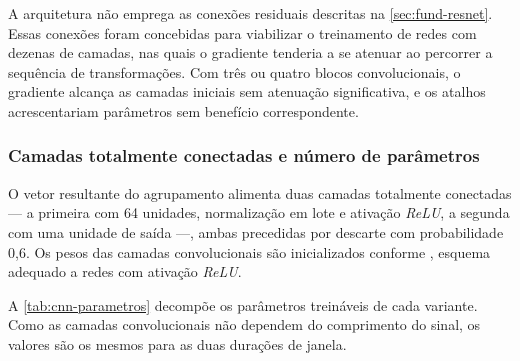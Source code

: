 A arquitetura não emprega as conexões residuais descritas na
\autoref{sec:fund-resnet}. Essas conexões foram concebidas para viabilizar o
treinamento de redes com dezenas de camadas, nas quais o gradiente tenderia a
se atenuar ao percorrer a sequência de transformações. Com três ou quatro
blocos convolucionais, o gradiente alcança as camadas iniciais sem atenuação
significativa, e os atalhos acrescentariam parâmetros sem benefício
correspondente.

\subsubsection{Camadas totalmente conectadas e número de parâmetros}
\label{subsubsec:fund-cnn-classificador}

O vetor resultante do agrupamento alimenta duas camadas totalmente
conectadas --- a primeira com 64 unidades,
normalização em lote e ativação \textit{ReLU}, a segunda com uma unidade de
saída ---, ambas precedidas por descarte com probabilidade 0,6. Os pesos das
camadas convolucionais são inicializados conforme ,
esquema adequado a redes com ativação \textit{ReLU}.

A \autoref{tab:cnn-parametros} decompõe os parâmetros treináveis de cada
variante. Como as camadas convolucionais não dependem do comprimento do
sinal, os valores são os mesmos para as duas durações de janela.

\begin{table}[h!]
	\captionsetup{width=13.5cm}
\end{table}

